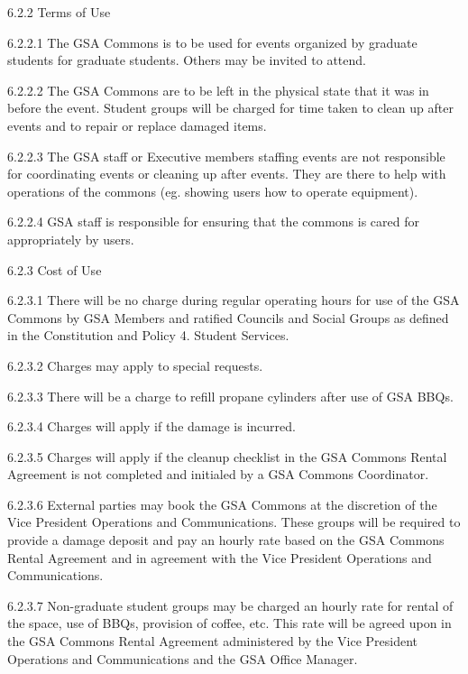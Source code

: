  6.2.2 Terms of Use 
 
 
 
 6.2.2.1 The GSA Commons is to be used for events organized by graduate 
 students for graduate students. Others may be invited to attend. 
 
 
 
 6.2.2.2 The GSA Commons are to be left in the physical state that it was in 
 before the event. Student groups will be charged for time taken to 
 clean up after events and to repair or replace damaged items. 
 
 
 
 6.2.2.3 The GSA staff or Executive members staffing events are not 
 responsible for coordinating events or cleaning up after events. 
 They are there to help with operations of the commons (eg. showing 
 users how to operate equipment). 
 
 
 
 6.2.2.4 GSA staff is responsible for ensuring that the commons is cared for 
 appropriately by users. 
 
 
 
 6.2.3 Cost of Use 
 
 
 
 6.2.3.1 There will be no charge during regular operating hours for use of 
 the GSA Commons by GSA Members and ratified Councils and 
 Social Groups as defined in the Constitution and Policy 4. Student Services. 
 
 6.2.3.2 Charges may apply to special requests. 
 
 6.2.3.3 There will be a charge to refill propane cylinders after use of GSA 
 BBQs. 
 
 6.2.3.4 Charges will apply if the damage is incurred. 
 
 6.2.3.5 Charges will apply if the cleanup checklist in the GSA Commons 
 Rental Agreement is not completed and initialed by a GSA 
 Commons Coordinator. 
 
 6.2.3.6 External parties may book the GSA Commons at the discretion of 
 the Vice President Operations and Communications. These groups 
 will be required to provide a damage deposit and pay an hourly rate 
 based on the GSA Commons Rental Agreement and in agreement 
 with the Vice President Operations and Communications. 
 
 6.2.3.7 Non-graduate student groups may be charged an hourly rate for 
 rental of the space, use of BBQs, provision of coffee, etc. This rate 
 will be agreed upon in the GSA Commons Rental Agreement 
 administered by the Vice President Operations and Communications 
 and the GSA Office Manager. 
 
